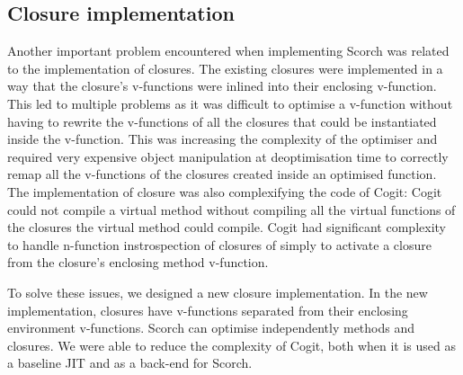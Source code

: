\documentclass[a4paper,12pt,twoside]{../includes/ThesisStyle}
\begin{document}
\subsection{Closure implementation}

Another important problem encountered when implementing Scorch was related to the implementation of closures. The existing closures were implemented in a way that the closure's v-functions were inlined into their enclosing v-function. This led to multiple problems as it was difficult to optimise a v-function without having to rewrite the v-functions of all the closures that could be instantiated inside the v-function. This was increasing the complexity of the optimiser and required very expensive object manipulation at deoptimisation time to correctly remap all the v-functions of the closures created inside an optimised function. The implementation of closure was also complexifying the code of Cogit: Cogit could not compile a virtual method without compiling all the virtual functions of the closures the virtual method could compile. Cogit had significant complexity to handle n-function instrospection of closures of simply to activate a closure from the closure's enclosing method v-function.

To solve these issues, we designed a new closure implementation. In the new implementation, closures have v-functions separated from their enclosing environment v-functions. Scorch can optimise independently methods and closures. We were able to reduce the complexity of Cogit, both when it is used as a baseline JIT and as a back-end for Scorch.


\ifx\wholebook\relax\else
    
\end{document}
